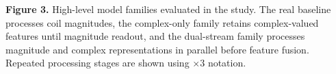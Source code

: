 \documentclass{article}
\begin{document}
\vspace{0.07in}
\begin{minipage}{6.94in}
\scriptsize
\textbf{Figure 3.} High-level model families evaluated in the study. The real baseline processes coil magnitudes, the complex-only family retains complex-valued features until magnitude readout, and the dual-stream family processes magnitude and complex representations in parallel before feature fusion. Repeated processing stages are shown using $\times 3$ notation.
\end{minipage}
\end{document}
